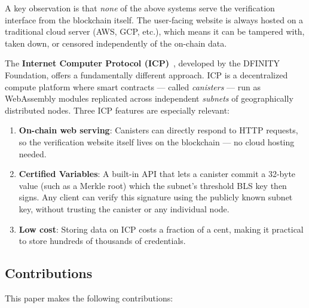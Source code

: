 \documentclass[journal]{IEEEtran}
\begin{document}
A key observation is that \emph{none} of the above systems serve the verification interface from the blockchain itself. The user-facing website is always hosted on a traditional cloud server (AWS, GCP, etc.), which means it can be tampered with, taken down, or censored independently of the on-chain data.

The \textbf{Internet Computer Protocol (ICP)}~\cite{hanke2018dfinity}, developed by the DFINITY Foundation, offers a fundamentally different approach. ICP is a decentralized compute platform where smart contracts — called \emph{canisters} — run as WebAssembly modules replicated across independent \emph{subnets} of geographically distributed nodes. Three ICP features are especially relevant:

\begin{enumerate}
  \item \textbf{On-chain web serving}: Canisters can directly respond to HTTP requests, so the verification website itself lives on the blockchain — no cloud hosting needed.
  \item \textbf{Certified Variables}: A built-in API that lets a canister commit a 32-byte value (such as a Merkle root) which the subnet's threshold BLS key then signs. Any client can verify this signature using the publicly known subnet key, without trusting the canister or any individual node.
  \item \textbf{Low cost}: Storing data on ICP costs a fraction of a cent, making it practical to store hundreds of thousands of credentials.
\end{enumerate}

\subsection{Contributions}

This paper makes the following contributions:
\end{document}
